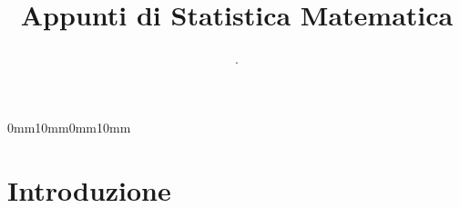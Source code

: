 \documentclass[11pt,a4paper]{article}
\title{Appunti di Statistica Matematica}
\author{.}
\date{}
\begin{document}
\setmarginsrb{30mm}{10mm}{25mm}{30mm}%
             {0mm}{10mm}{0mm}{10mm}
             
\maketitle
\section{Introduzione}






\end{document}
